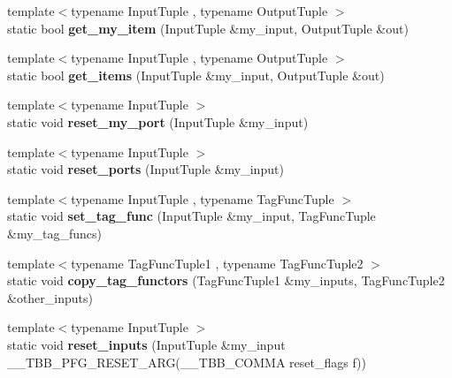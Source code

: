 \begin{DoxyCompactItemize}
\item 
\hypertarget{structinternal_1_1join__helper_a349a985ec6361c67f58cd6aaa62068af}{}{\footnotesize template$<$typename Input\+Tuple , typename Output\+Tuple $>$ }\\static bool {\bfseries get\+\_\+my\+\_\+item} (Input\+Tuple \&my\+\_\+input, Output\+Tuple \&out)\label{structinternal_1_1join__helper_a349a985ec6361c67f58cd6aaa62068af}

\item 
\hypertarget{structinternal_1_1join__helper_a4d5566dcfe63959194b4aa9cf5d0a9e3}{}{\footnotesize template$<$typename Input\+Tuple , typename Output\+Tuple $>$ }\\static bool {\bfseries get\+\_\+items} (Input\+Tuple \&my\+\_\+input, Output\+Tuple \&out)\label{structinternal_1_1join__helper_a4d5566dcfe63959194b4aa9cf5d0a9e3}

\item 
\hypertarget{structinternal_1_1join__helper_a0da024ac3c84d1f234bbe6d5062749ee}{}{\footnotesize template$<$typename Input\+Tuple $>$ }\\static void {\bfseries reset\+\_\+my\+\_\+port} (Input\+Tuple \&my\+\_\+input)\label{structinternal_1_1join__helper_a0da024ac3c84d1f234bbe6d5062749ee}

\item 
\hypertarget{structinternal_1_1join__helper_aac3f4d59f317b31600fec60024ab4e1a}{}{\footnotesize template$<$typename Input\+Tuple $>$ }\\static void {\bfseries reset\+\_\+ports} (Input\+Tuple \&my\+\_\+input)\label{structinternal_1_1join__helper_aac3f4d59f317b31600fec60024ab4e1a}

\item 
\hypertarget{structinternal_1_1join__helper_a2ed0ee4c28c5c8f7fec65f3d9c501f9c}{}{\footnotesize template$<$typename Input\+Tuple , typename Tag\+Func\+Tuple $>$ }\\static void {\bfseries set\+\_\+tag\+\_\+func} (Input\+Tuple \&my\+\_\+input, Tag\+Func\+Tuple \&my\+\_\+tag\+\_\+funcs)\label{structinternal_1_1join__helper_a2ed0ee4c28c5c8f7fec65f3d9c501f9c}

\item 
\hypertarget{structinternal_1_1join__helper_aa76e86e8f527f13721d6420a2cdfed93}{}{\footnotesize template$<$typename Tag\+Func\+Tuple1 , typename Tag\+Func\+Tuple2 $>$ }\\static void {\bfseries copy\+\_\+tag\+\_\+functors} (Tag\+Func\+Tuple1 \&my\+\_\+inputs, Tag\+Func\+Tuple2 \&other\+\_\+inputs)\label{structinternal_1_1join__helper_aa76e86e8f527f13721d6420a2cdfed93}

\item 
\hypertarget{structinternal_1_1join__helper_aa7897e2b6441001483faec7c8950598b}{}{\footnotesize template$<$typename Input\+Tuple $>$ }\\static void {\bfseries reset\+\_\+inputs} (Input\+Tuple \&my\+\_\+input \+\_\+\+\_\+\+T\+B\+B\+\_\+\+P\+F\+G\+\_\+\+R\+E\+S\+E\+T\+\_\+\+A\+R\+G(\+\_\+\+\_\+\+T\+B\+B\+\_\+\+C\+O\+M\+M\+A reset\+\_\+flags f))\label{structinternal_1_1join__helper_aa7897e2b6441001483faec7c8950598b}

\end{DoxyCompactItemize}


